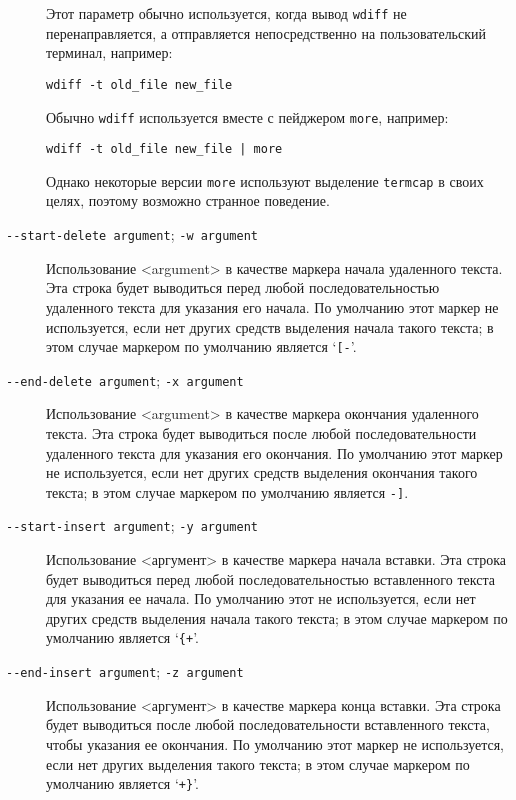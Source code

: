 \begin{description}
Этот параметр обычно используется, когда вывод \texttt{wdiff} не
перенаправляется, а отправляется непосредственно на пользовательский
терминал, например:

\begin{verbatim}
wdiff -t old_file new_file
\end{verbatim}

Обычно \texttt{wdiff} используется вместе с пейджером \texttt{more},
например:

\begin{verbatim}
wdiff -t old_file new_file | more
\end{verbatim}

Однако некоторые версии \texttt{more} используют выделение
\texttt{termcap} в своих целях, поэтому возможно странное поведение.
\item[\texttt{-\/-start-delete\ argument}; \texttt{-w\ argument}]
Использование \textless argument\textgreater{} в качестве маркера начала
удаленного текста. Эта строка будет выводиться перед любой
последовательностью удаленного текста для указания его начала. По
умолчанию этот маркер не используется, если нет других средств выделения
начала такого текста; в этом случае маркером по умолчанию является
`\texttt{{[}-}'.
\item[\texttt{-\/-end-delete\ argument}; \texttt{-x\ argument}]
Использование \textless argument\textgreater{} в качестве маркера
окончания удаленного текста. Эта строка будет выводиться после любой
последовательности удаленного текста для указания его окончания. По
умолчанию этот маркер не используется, если нет других средств выделения
окончания такого текста; в этом случае маркером по умолчанию является
\texttt{-{]}}.
\item[\texttt{-\/-start-insert\ argument}; \texttt{-y\ argument}]
Использование \textless аргумент\textgreater{} в качестве маркера начала
вставки. Эта строка будет выводиться перед любой последовательностью
вставленного текста для указания ее начала. По умолчанию этот не
используется, если нет других средств выделения начала такого текста; в
этом случае маркером по умолчанию является `\texttt{\{+}'.
\item[\texttt{-\/-end-insert\ argument}; \texttt{-z\ argument}]
Использование \textless аргумент\textgreater{} в качестве маркера конца
вставки. Эта строка будет выводиться после любой последовательности
вставленного текста, чтобы указания ее окончания. По умолчанию этот
маркер не используется, если нет других выделения такого текста; в этом
случае маркером по умолчанию является `\texttt{+\}}'.

\end{description}
